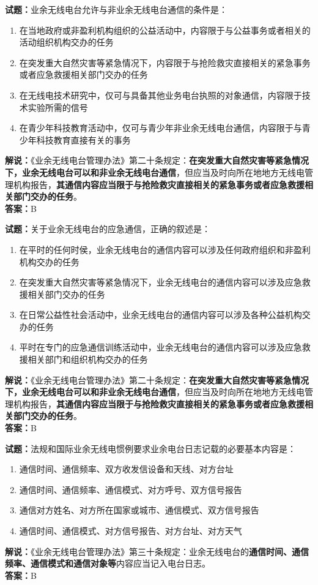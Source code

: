 \documentclass{ctexbook}
\begin{document}
\textbf{试题：}业余无线电台允许与非业余无线电台通信的条件是：
\begin{enumerate}[leftmargin=3em]
  \item 在当地政府或非盈利机构组织的公益活动中，内容限于与公益事务或者相关的活动组织机构交办的任务
  \item 在突发重大自然灾害等紧急情况下，内容限于与抢险救灾直接相关的紧急事务或者应急救援相关部门交办的任务
  \item 在无线电技术研究中，仅可与具备其他业务电台执照的对象通信，内容限于技术实验所需的信号
  \item 在青少年科技教育活动中，仅可与青少年非业余无线电台通信，内容限于与青少年科技教育直接有关的事务
\end{enumerate}
\noindent\textbf{解说：}《业余无线电台管理办法》第二十条规定：\textbf{在突发重大自然灾害等紧急情况下，业余无线电台可以和非业余无线电台通信}，但应当及时向所在地地方无线电管理机构报告，\textbf{其通信内容应当限于与抢险救灾直接相关的紧急事务或者应急救援相关部门交办的任务}。\\\noindent\textbf{答案：}B

\vspace{1em}

\textbf{试题：}关于业余无线电台的应急通信，正确的叙述是：
\begin{enumerate}[leftmargin=3em]
  \item 在平时的任何时侯，业余无线电台的通信内容可以涉及任何政府组织和非盈利机构交办的任务
  \item 在突发重大自然灾害等紧急情况下，业余无线电台的通信内容可以涉及应急救援相关部门交办的任务
  \item 在日常公益性社会活动中，业余无线电台的通信内容可以涉及各种公益机构交办的任务
  \item 平时在专门的应急通信训练活动中，业余无线电台的通信内容可以涉及应急救援相关部门和组织机构交办的任务
\end{enumerate}
\noindent\textbf{解说：}《业余无线电台管理办法》第二十条规定：\textbf{在突发重大自然灾害等紧急情况下，业余无线电台可以和非业余无线电台通信}，但应当及时向所在地地方无线电管理机构报告，\textbf{其通信内容应当限于与抢险救灾直接相关的紧急事务或者应急救援相关部门交办的任务}。\\\noindent\textbf{答案：}B

\vspace{1em}

\textbf{试题：}法规和国际业余无线电惯例要求业余电台日志记载的必要基本内容是：
\begin{enumerate}[leftmargin=3em]
  \item 通信时间、通信频率、双方收发信设备和天线、对方台址
  \item 通信时间、通信频率、通信模式、对方呼号、双方信号报告
  \item 通信对方姓名、对方所在国家或城市、通信模式、双方信号报告
  \item 通信时间、通信模式、对方信号报告、对方台址、对方天气
\end{enumerate}
\noindent\textbf{解说：}《业余无线电台管理办法》第三十条规定：业余无线电台的\textbf{通信时间、通信频率、通信模式和通信对象等}内容应当记入电台日志。\\\noindent\textbf{答案：}B
\end{document}
